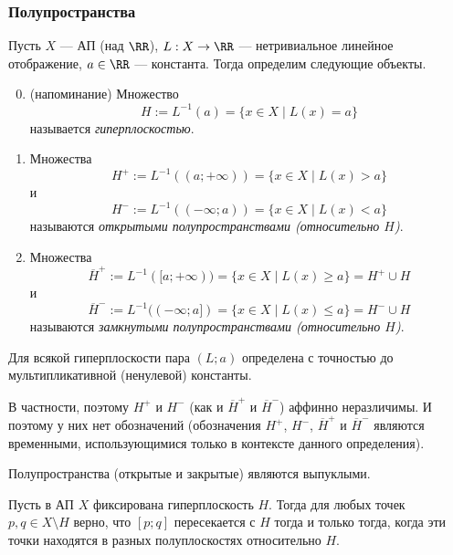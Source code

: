 \documentclass[12pt,a4paper]{article}
\begin{document}
    \subsubsection{Полупространства}

    \begin{definition}
        Пусть $X$ --- АП (над $\RR$), $L: X \to \RR$ --- нетривиальное линейное отображение, $a \in \RR$ --- константа. Тогда определим следующие объекты.
        \begin{enumerate}
            \setcounter{enumi}{-1}
            \item (напоминание) Множество
                \[H := L^{-1}(a) = \{x \in X \mid L(x) = a\}\]
                называется \emph{гиперплоскостью}.
            \item Множества
                \[
                    H^+ := L^{-1}((a; +\infty)) = \{x \in X \mid L(x) > a\}
                \]
                и
                \[
                    H^- := L^{-1}((-\infty; a)) = \{x \in X \mid L(x) < a\}
                \]
                называются \emph{открытыми полупространствами (относительно $H$)}.
            \item Множества
                \[
                    \overline{H}^+ := L^{-1}([a; +\infty)) = \{x \in X \mid L(x) \geqslant a\} = H^+ \cup H
                \]
                и
                \[
                    \overline{H}^- := L^{-1}((-\infty; a]) = \{x \in X \mid L(x) \leqslant a\} = H^- \cup H
                \]
                называются \emph{замкнутыми полупространствами (относительно $H$)}.
        \end{enumerate}
    \end{definition}

    \begin{remark*}
        Для всякой гиперплоскости пара $(L; a)$ определена с точностью до мультипликативной (ненулевой) константы.

        В частности, поэтому $H^+$ и $H^-$ (как и $\overline{H}^+$ и $\overline{H}^-$) аффинно неразличимы. И поэтому у них нет обозначений (обозначения $H^+$, $H^-$, $\overline{H}^+$ и $\overline{H}^-$ являются временными, использующимися только в контексте данного определения).
    \end{remark*}

    \begin{lemma}
        Полупространства (открытые и закрытые) являются выпуклыми.
    \end{lemma}

    \begin{lemma}
        Пусть в АП $X$ фиксирована гиперплоскость $H$. Тогда для любых точек $p, q \in X \setminus H$ верно, что $[p;q]$ пересекается с $H$ тогда и только тогда, когда эти точки находятся в разных полуплоскостях относительно $H$.
    \end{lemma}
\end{document}
